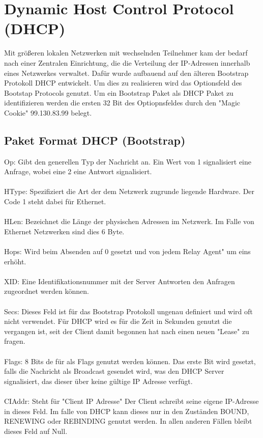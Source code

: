 \section{Dynamic Host Control Protocol (DHCP)}
Mit größeren lokalen Netzwerken mit wechselnden Teilnehmer kam der bedarf nach einer Zentralen Einrichtung, die die Verteilung der IP-Adressen innerhalb eines Netzwerkes verwaltet. Dafür wurde aufbauend auf den älteren Bootstrap Protokoll DHCP entwickelt. Um dies zu realisieren wird das Optionsfeld des Bootstap Protocols genutzt. Um ein Bootstrap Paket als DHCP Paket zu identifizieren werden die ersten 32 Bit des Optiopnsfeldes durch den "Magic Cookie" 99.130.83.99 belegt. 


\subsection{Paket Format DHCP (Bootstrap)}
Op: Gibt den generellen Typ der Nachricht an. Ein Wert von 1 signalisiert eine Anfrage, wobei eine 2 eine Antwort signalisiert. \\\\
HType: Spezifiziert die Art der dem Netzwerk zugrunde liegende Hardware. Der Code 1 steht dabei für Ethernet. \\\\
HLen: Bezeichnet die Länge der physischen Adressen im Netzwerk. Im Falle von Ethernet Netzwerken sind dies 6 Byte. \\\\
Hops: Wird beim Absenden auf 0 gesetzt und von jedem Relay Agent" um eins erhöht. \\\\
XID: Eine Identifikationsnummer mit der Server Antworten den Anfragen zugeordnet werden können. \\\\
Secs: Dieses Feld ist für das Bootstrap Protokoll ungenau definiert und wird oft nicht verwendet. Für DHCP wird es für die Zeit in Sekunden genutzt die vergangen ist, seit der Client damit begonnen hat nach einen neuen "Lease" zu fragen. \\\\
Flags: 8 Bits de für als Flags genutzt werden können. Das erste Bit wird gesetzt, falls die Nachricht als Broadcast gesendet wird, was den DHCP Server signalisiert, das dieser über keine gültige IP Adresse verfügt. \\\\
CIAddr: Steht für "Client IP Adresse" Der Client schreibt seine eigene IP-Adresse in dieses Feld. Im falle von DHCP kann dieses nur in den Zuständen BOUND, RENEWING oder REBINDING genutzt werden. In allen anderen Fällen bleibt dieses Feld auf Null. \\\\
